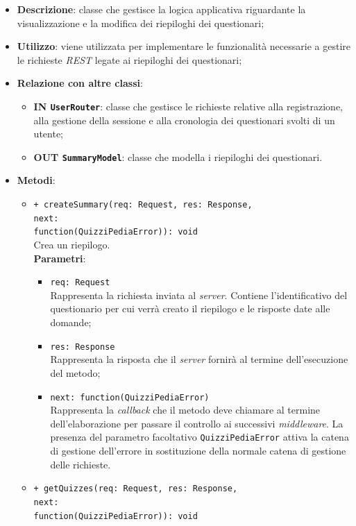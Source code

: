 \begin{itemize}
	\item \textbf{Descrizione}:
	classe che gestisce la logica applicativa riguardante la visualizzazione e la modifica dei riepiloghi dei questionari;
	\item \textbf{Utilizzo}:
	viene utilizzata per implementare le funzionalità necessarie a gestire le richieste \textit{REST} legate ai riepiloghi dei questionari;
	\item \textbf{Relazione con altre classi}:
	\begin{itemize}
			\item \textbf{IN \texttt{UserRouter}}:
			classe che gestisce le richieste relative alla registrazione, alla gestione della sessione e alla cronologia dei questionari svolti di un utente;
			\item \textbf{OUT \texttt{SummaryModel}}:
			classe che modella i riepiloghi dei questionari.
	\end{itemize}
	\item \textbf{Metodi}:
	\begin{itemize}
		\item \texttt{+ createSummary(req: Request, res: Response, \\next: \\function(QuizziPediaError)): void}\\
		Crea un riepilogo.\\
		\textbf{Parametri}:
		\begin{itemize}
			\item \texttt{req: Request}\\
			Rappresenta la richiesta inviata al \textit{server}. Contiene l'identificativo del questionario per cui verrà creato il riepilogo e le risposte date alle domande;
			\item \texttt{res: Response}\\
			Rappresenta la risposta che il \textit{server} fornirà al termine dell'esecuzione del metodo;
			\item \texttt{next: function(QuizziPediaError)}\\
			Rappresenta la \textit{callback} che il metodo deve chiamare al termine dell'elaborazione per passare il controllo ai successivi \textit{middleware}. La presenza del parametro facoltativo \texttt{QuizziPediaError} attiva la catena di gestione dell'errore in sostituzione della normale catena di gestione delle richieste.
		\end{itemize}
		\item \texttt{+ getQuizzes(req: Request, res: Response, \\next: \\function(QuizziPediaError)): void}\\

\end{itemize}
\end{itemize}
